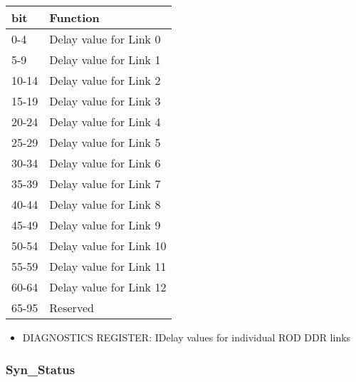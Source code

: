 \begin {table}[H]
\begin{center}
\begin{tabular}{|l|l|}
\hline
\textbf{bit} & \textbf{Function} \\
\hline
0-4 & Delay value for Link 0 \\
\hline
5-9 & Delay value for Link 1 \\
\hline
10-14 & Delay value for Link 2 \\
\hline
15-19 & Delay value for Link 3 \\
\hline
20-24 & Delay value for Link 4 \\
\hline
25-29 & Delay value for Link 5 \\
\hline
30-34 & Delay value for Link 6 \\
\hline
35-39 & Delay value for Link 7 \\
\hline
40-44 & Delay value for Link 8 \\
\hline
45-49 & Delay value for Link 9 \\
\hline
50-54 & Delay value for Link 10 \\
\hline
55-59 & Delay value for Link 11 \\
\hline
60-64 & Delay value for Link 12 \\
\hline
65-95 & Reserved \\
\hline
\end{tabular}
\end{center}
\end{table}


\begin{itemize}
\item DIAGNOSTICS REGISTER: IDelay values for individual ROD DDR links
\end{itemize}



\subsubsection{Syn\_Status}

